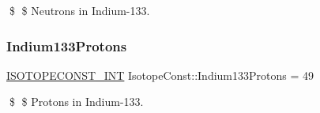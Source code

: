 \$ \$ Neutrons in Indium-\/133. \mbox{\label{group___isotope_const-_indium-_in133_gabd902452b5518c9dfaee0075aec51df9}} 
\subsubsection{\texorpdfstring{Indium133\+Protons}{Indium133Protons}}
{\footnotesize\ttfamily \mbox{\hyperlink{group___isotope_const-_macros_ga5f18360b3e99483a35c32d789e62621c}{I\+S\+O\+T\+O\+P\+E\+C\+O\+N\+S\+T\+\_\+\+I\+NT}} Isotope\+Const\+::\+Indium133\+Protons = 49}

\$ \$ Protons in Indium-\/133. 